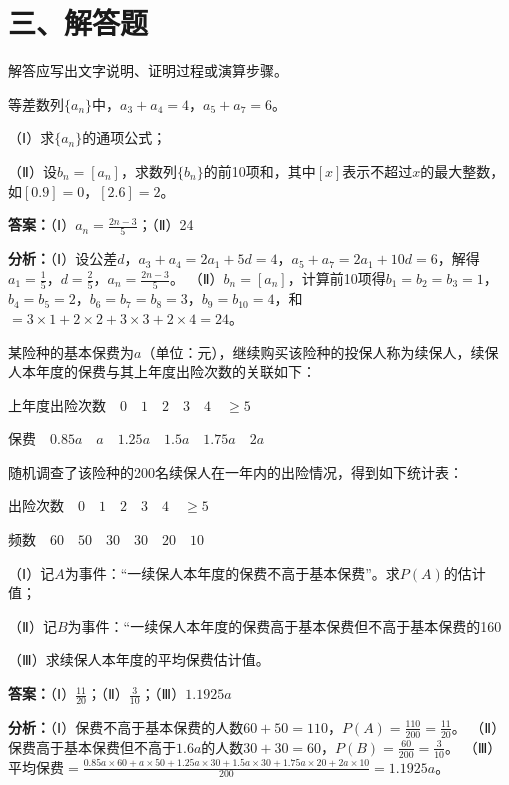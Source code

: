 \section*{三、解答题}
解答应写出文字说明、证明过程或演算步骤。

\begin{question}[points=12]
等差数列$\{a_n\}$中，$a_3+a_4=4$，$a_5+a_7=6$。

（Ⅰ）求$\{a_n\}$的通项公式；

（Ⅱ）设$b_n=[a_n]$，求数列$\{b_n\}$的前10项和，其中$[x]$表示不超过$x$的最大整数，如$[0.9]=0$，$[2.6]=2$。
\begin{solution}
\textbf{答案：}（Ⅰ）$a_n=\frac{2n-3}{5}$；（Ⅱ）24

\textbf{分析：}（Ⅰ）设公差$d$，$a_3+a_4=2a_1+5d=4$，$a_5+a_7=2a_1+10d=6$，解得$a_1=\frac{1}{5}$，$d=\frac{2}{5}$，$a_n=\frac{2n-3}{5}$。
（Ⅱ）$b_n=[a_n]$，计算前10项得$b_1=b_2=b_3=1$，$b_4=b_5=2$，$b_6=b_7=b_8=3$，$b_9=b_{10}=4$，和$=3\times1+2\times2+3\times3+2\times4=24$。
\end{solution}
\end{question}

\begin{question}[points=12]
某险种的基本保费为$a$（单位：元），继续购买该险种的投保人称为续保人，续保人本年度的保费与其上年度出险次数的关联如下：



上年度出险次数$\quad0\quad1\quad2\quad3\quad4\quad\ge5$

保费$\quad0.85a\quad a\quad1.25a\quad1.5a\quad1.75a\quad2a$



随机调查了该险种的200名续保人在一年内的出险情况，得到如下统计表：



出险次数$\quad0\quad1\quad2\quad3\quad4\quad\ge5$

频数$\quad60\quad50\quad30\quad30\quad20\quad10$



（Ⅰ）记$A$为事件：“一续保人本年度的保费不高于基本保费”。求$P(A)$的估计值；

（Ⅱ）记$B$为事件：“一续保人本年度的保费高于基本保费但不高于基本保费的160%

（Ⅲ）求续保人本年度的平均保费估计值。
\begin{solution}
\textbf{答案：}（Ⅰ）$\frac{11}{20}$；（Ⅱ）$\frac{3}{10}$；（Ⅲ）$1.1925a$

\textbf{分析：}（Ⅰ）保费不高于基本保费的人数$60+50=110$，$P(A)=\frac{110}{200}=\frac{11}{20}$。
（Ⅱ）保费高于基本保费但不高于$1.6a$的人数$30+30=60$，$P(B)=\frac{60}{200}=\frac{3}{10}$。
（Ⅲ）平均保费$=\frac{0.85a\times60+a\times50+1.25a\times30+1.5a\times30+1.75a\times20+2a\times10}{200}=1.1925a$。
\end{solution}
\end{question}

